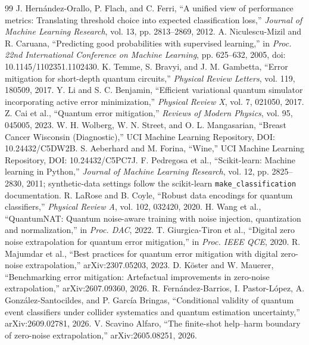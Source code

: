 \documentclass[conference]{IEEEtran}
\begin{document}
\begin{thebibliography}{99}
 J. Hern\'andez-Orallo, P. Flach, and C. Ferri, ``A unified view of performance metrics: Translating threshold choice into expected classification loss,'' \emph{Journal of Machine Learning Research}, vol. 13, pp. 2813--2869, 2012.
 A. Niculescu-Mizil and R. Caruana, ``Predicting good probabilities with supervised learning,'' in \emph{Proc. 22nd International Conference on Machine Learning}, pp. 625--632, 2005, doi: 10.1145/1102351.1102430.
 K. Temme, S. Bravyi, and J. M. Gambetta, ``Error mitigation for short-depth quantum circuits,'' \emph{Physical Review Letters}, vol. 119, 180509, 2017.
 Y. Li and S. C. Benjamin, ``Efficient variational quantum simulator incorporating active error minimization,'' \emph{Physical Review X}, vol. 7, 021050, 2017.
 Z. Cai et al., ``Quantum error mitigation,'' \emph{Reviews of Modern Physics}, vol. 95, 045005, 2023.
 W. H. Wolberg, W. N. Street, and O. L. Mangasarian, ``Breast Cancer Wisconsin (Diagnostic),'' UCI Machine Learning Repository, DOI: 10.24432/C5DW2B.
 S. Aeberhard and M. Forina, ``Wine,'' UCI Machine Learning Repository, DOI: 10.24432/C5PC7J.
 F. Pedregosa et al., ``Scikit-learn: Machine learning in Python,'' \emph{Journal of Machine Learning Research}, vol. 12, pp. 2825--2830, 2011; synthetic-data settings follow the scikit-learn \texttt{make\_classification} documentation.
 R. LaRose and B. Coyle, ``Robust data encodings for quantum classifiers,'' \emph{Physical Review A}, vol. 102, 032420, 2020.
 H. Wang et al., ``QuantumNAT: Quantum noise-aware training with noise injection, quantization and normalization,'' in \emph{Proc. DAC}, 2022.
 T. Giurgica-Tiron et al., ``Digital zero noise extrapolation for quantum error mitigation,'' in \emph{Proc. IEEE QCE}, 2020.
 R. Majumdar et al., ``Best practices for quantum error mitigation with digital zero-noise extrapolation,'' arXiv:2307.05203, 2023.
 D. K\"oster and W. Mauerer, ``Benchmarking error mitigation: Artefactual improvements in zero-noise extrapolation,'' arXiv:2607.09360, 2026.
 R. Fern\'andez-Barrios, I. Pastor-L\'opez, A. Gonz\'alez-Santocildes, and P. Garc\'ia Bringas, ``Conditional validity of quantum event classifiers under collider systematics and quantum estimation uncertainty,'' arXiv:2609.02781, 2026.
 V. Scavino Alfaro, ``The finite-shot help--harm boundary of zero-noise extrapolation,'' arXiv:2605.08251, 2026.

\end{thebibliography}
\end{document}
